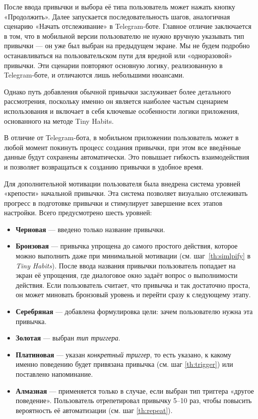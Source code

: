 \documentclass[pdflatex,sn-mathphys-num]{sn-jnl}%
\theoremstyle{thmstyleone}%
\theoremstyle{thmstyletwo}%
\theoremstyle{thmstylethree}%
\begin{document}
После ввода привычки и выбора её типа пользователь может нажать кнопку «Продолжить». Далее запускается последовательность шагов, аналогичная сценарию «Начать отслеживание» в Telegram-боте. Главное отличие заключается в том, что в мобильной версии пользователю не нужно вручную указывать тип привычки — он уже был выбран на предыдущем экране. Мы не будем подробно останавливаться на пользовательском пути для вредной или «одноразовой» привычки. Эти сценарии повторяют основную логику, реализованную в Telegram-боте, и отличаются лишь небольшими нюансами.

Однако путь добавления обычной привычки заслуживает более детального рассмотрения, поскольку именно он является наиболее частым сценарием использования и включает в себя ключевые особенности логики приложения, основанного на методе Tiny Habits.

В отличие от Telegram-бота, в мобильном приложении пользователь может в любой момент покинуть процесс создания привычки, при этом все введённые данные будут сохранены автоматически. Это повышает гибкость взаимодействия и позволяет возвращаться к созданию привычки в удобное время.

Для дополнительной мотивации пользователя была внедрена система уровней «крепости» начальной привычки. Эта система позволяет визуально отслеживать прогресс в подготовке привычки и стимулирует завершение всех этапов настройки. Всего предусмотрено шесть уровней:

\begin{itemize}
    \item \textbf{Черновая} — введено только название привычки.
    \item \textbf{Бронзовая} — привычка упрощена до самого простого действия, которое можно выполнить даже при минимальной мотивации (см. шаг~\ref{th:simlpify} в \textit{Tiny Habits}). После ввода названия привычки пользователь попадает на экран её упрощения, где диалоговое окно задаёт вопрос о выполнимости действия. Если пользователь считает, что привычка и так достаточно проста, он может миновать бронзовый уровень и перейти сразу к следующему этапу.
    \item \textbf{Серебряная} — добавлена формулировка цели: зачем пользователю нужна эта привычка.
    \item \textbf{Золотая} — выбран \textit{тип триггера}.
    \item \textbf{Платиновая} — указан \textit{конкретный триггер}, то есть указано, к какому именно поведению будет привязана привычка (см. шаг \ref{th:trigger}) или поставлено напоминание.
    \item \textbf{Алмазная} — применяется только в случае, если выбран тип триггера «другое поведение». Пользователь отрепетировал привычку 5–10 раз, чтобы повысить вероятность её автоматизации (см. шаг \ref{th:repeat}).
\end{itemize}
\end{document}
